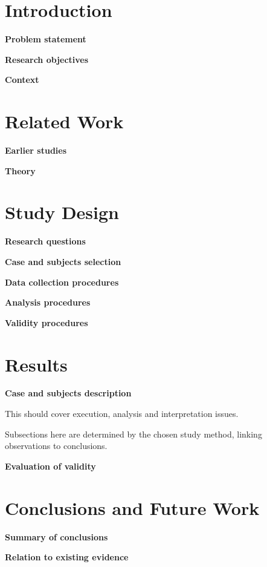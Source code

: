 \documentclass[10pt,journal,compsoc]{joser1}
\begin{document}
\section{Introduction}

\textbf{Problem statement}

\noindent\textbf{Research objectives}

\noindent\textbf{Context}

\section{Related Work}

\textbf{Earlier studies}

\noindent\textbf{Theory}

\section{Study Design}

\noindent\textbf{Research questions}

\noindent\textbf{Case and subjects selection}

\noindent\textbf{Data collection procedures}

\noindent\textbf{Analysis procedures}

\noindent\textbf{Validity procedures}

\section{Results}

\noindent\textbf{Case and subjects description}

This should cover execution, analysis and interpretation issues. 

Subsections here are determined by the chosen study method, linking observations to conclusions.

\noindent\textbf{Evaluation of validity}

\section{Conclusions and Future Work}

\noindent\textbf{Summary of conclusions}

\noindent\textbf{Relation to existing evidence}
\end{document}
